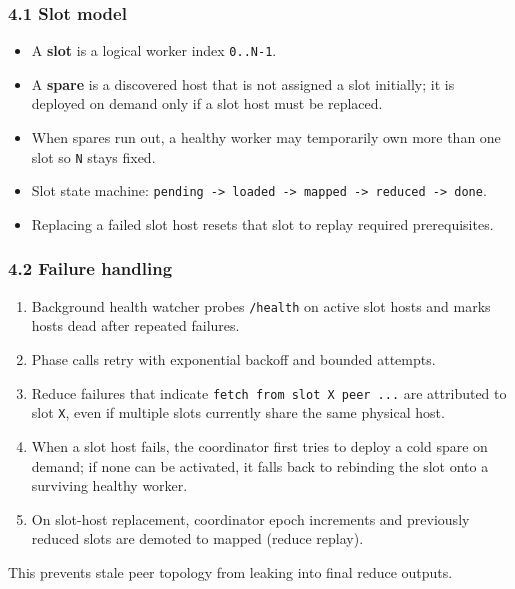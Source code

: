 \documentclass[
]{article}
\providecommand{\tightlist}{%
  \setlength{\itemsep}{0pt}\setlength{\parskip}{0pt}}
\begin{document}
\subsubsection{4.1 Slot model}\label{slot-model}

\begin{itemize}
\tightlist
\item
  A \textbf{slot} is a logical worker index \texttt{0..N-1}.
\item
  A \textbf{spare} is a discovered host that is not assigned a slot
  initially; it is deployed on demand only if a slot host must be
  replaced.
\item
  When spares run out, a healthy worker may temporarily own more than
  one slot so \texttt{N} stays fixed.
\item
  Slot state machine:
  \texttt{pending\ -\textgreater{}\ loaded\ -\textgreater{}\ mapped\ -\textgreater{}\ reduced\ -\textgreater{}\ done}.
\item
  Replacing a failed slot host resets that slot to replay required
  prerequisites.
\end{itemize}

\subsubsection{4.2 Failure handling}\label{failure-handling}

\begin{enumerate}
\def\labelenumi{\arabic{enumi}.}
\tightlist
\item
  Background health watcher probes \texttt{/health} on active slot hosts
  and marks hosts dead after repeated failures.
\item
  Phase calls retry with exponential backoff and bounded attempts.
\item
  Reduce failures that indicate \texttt{fetch\ from\ slot\ X\ peer\ ...}
  are attributed to slot \texttt{X}, even if multiple slots currently
  share the same physical host.
\item
  When a slot host fails, the coordinator first tries to deploy a cold
  spare on demand; if none can be activated, it falls back to rebinding
  the slot onto a surviving healthy worker.
\item
  On slot-host replacement, coordinator epoch increments and previously
  reduced slots are demoted to mapped (reduce replay).
\end{enumerate}

This prevents stale peer topology from leaking into final reduce
outputs.
\end{document}
